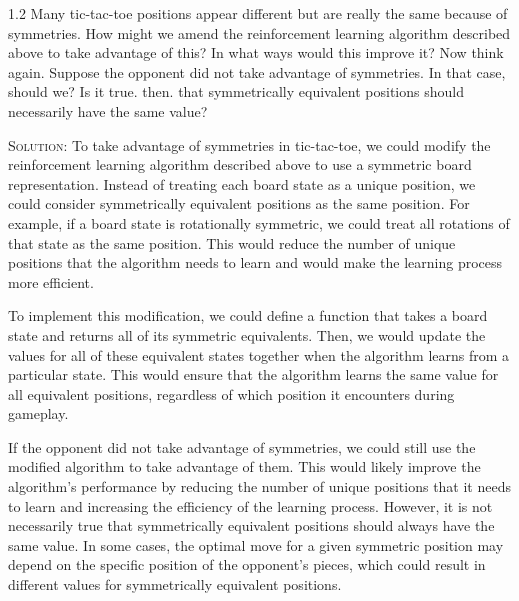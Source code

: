 \documentclass{article}
\begin{document}
1.2 Many tic-tac-toe positions appear different but are really 
the same because of symmetries. How might we amend the reinforcement learning 
algorithm described above to take advantage of this? In what ways would this improve it? Now think 
again. Suppose the opponent did not take advantage of symmetries. In that case, should we? Is it 
true. then. that symmetrically equivalent positions 
should necessarily have the same value?

\textsc{Solution:} To take advantage of symmetries in tic-tac-toe, 
we could modify the reinforcement learning algorithm described above 
to use a symmetric board representation. Instead of 
treating each board state as a unique position, we could consider
symmetrically equivalent positions as the same position. For example,
if a board state is rotationally symmetric, we could treat all 
rotations of that state as the same position. This would reduce 
the number of unique positions that the algorithm needs to learn 
and would make the learning process more efficient.

To implement this modification, we could define a function that takes 
a board state and returns all of its symmetric equivalents. Then, 
we would update the values for all of these equivalent states 
together when the algorithm learns from a particular state. This would ensure that the algorithm 
learns the same value for all equivalent positions, regardless of which position it encounters 
during gameplay.

If the opponent did not take advantage of symmetries, we could
still use the modified algorithm to take advantage of them. This would likely improve the 
algorithm's performance by reducing the number of unique 
positions that it needs to learn and increasing the efficiency of 
the learning process. However, it is not necessarily true that 
symmetrically equivalent positions should always have the same value. In some cases, the optimal move 
for a given symmetric position may depend on the specific position of
the opponent's pieces, which could result in different values for 
symmetrically equivalent positions.
\end{document}

